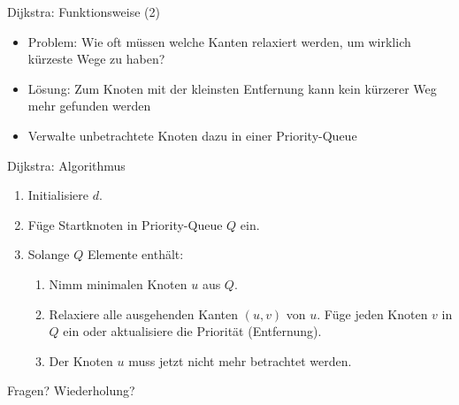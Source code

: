 \begin{frame}{Dijkstra: Funktionsweise (2)}
	\begin{itemize}
		\item Problem: Wie oft müssen welche Kanten relaxiert werden, um wirklich kürzeste Wege zu haben?
		\item Lösung: Zum Knoten mit der kleinsten Entfernung kann kein kürzerer Weg mehr gefunden werden
		\item Verwalte unbetrachtete Knoten dazu in einer Priority-Queue
	\end{itemize}
\end{frame}

\begin{frame}{Dijkstra: Algorithmus}
	\begin{enumerate}
		\item Initialisiere $d$.
		\item Füge Startknoten in Priority-Queue $Q$ ein.
		\item Solange $Q$ Elemente enthält:
			\begin{enumerate}
				\item Nimm minimalen Knoten $u$ aus $Q$.
				\item Relaxiere alle ausgehenden Kanten $(u, v)$ von $u$. Füge jeden Knoten $v$ in $Q$ ein oder aktualisiere die Priorität (Entfernung).
				\item Der Knoten $u$ muss jetzt nicht mehr betrachtet werden.
			\end{enumerate}
	\end{enumerate}
\end{frame}

\begin{frame}
	\begin{center}
		\Huge
		Fragen? Wiederholung?
	\end{center}
\end{frame}



